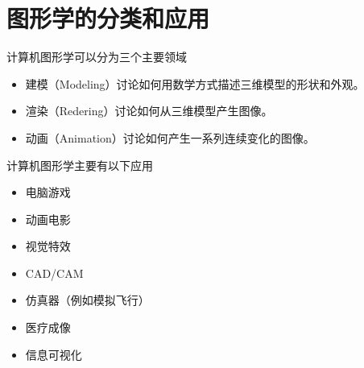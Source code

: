 \section{图形学的分类和应用}

计算机图形学可以分为三个主要领域
\begin{itemize}
    \item 建模（Modeling）讨论如何用数学方式描述三维模型的形状和外观。
    \item 渲染（Redering）讨论如何从三维模型产生图像。
    \item 动画（Animation）讨论如何产生一系列连续变化的图像。
\end{itemize}
计算机图形学主要有以下应用
\begin{itemize}
    \item 电脑游戏
    \item 动画电影
    \item 视觉特效
    \item CAD/CAM
    \item 仿真器（例如模拟飞行）
    \item 医疗成像
    \item 信息可视化
\end{itemize}